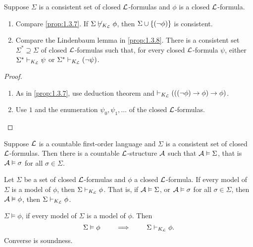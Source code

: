 \begin{proposition}
\label{prop:2.5.2}
Suppose $ \Sigma $ is a consistent set of closed $ \LL $-formulas and $ \phi $ is a closed $ \LL $-formula.
\begin{enumerate}
\item Compare \ref{prop:1.3.7}. If $ \Sigma \not\vdash_{K_{\LL}} \phi $, then $ \Sigma \cup \cb{\notb{\phi}} $ is consistent.
\item Compare the Lindenbaum lemma in \ref{prop:1.3.8}. There is a consistent set $ \Sigma^* \supseteq \Sigma $ of closed $ \LL $-formulas such that, for every closed $ \LL $-formula $ \psi $, either $ \Sigma^* \vdash_{K_{\LL}} \psi $ or $ \Sigma^* \vdash_{K_{\LL}} \notb{\psi} $.
\end{enumerate}
\end{proposition}

\begin{proof}
\hfill
\begin{enumerate}
\item As in \ref{prop:1.3.7}, use deduction theorem and $ \vdash_{K_{\LL}} \impb{\impb{\notb{\phi}}{\phi}}{\phi} $.
\item Use $ 1 $ and the enumeration $ \psi_0, \psi_1, \dots $ of the closed $ \LL $-formulas.
\end{enumerate}
\end{proof}

\pagebreak

\begin{theorem}
\label{thm:2.5.3}
Suppose $ \LL $ is a countable first-order language and $ \Sigma $ is a consistent set of closed $ \LL $-formulas. Then there is a countable $ \LL $-structure $ \AA $ such that $ \AA \vDash \Sigma $, that is $ \AA \vDash \sigma $ for all $ \sigma \in \Sigma $.
\end{theorem}

\begin{theorem}
\label{thm:2.5.4}
Let $ \Sigma $ be a set of closed $ \LL $-formulas and $ \phi $ a closed $ \LL $-formula. If every model of $ \Sigma $ is a model of $ \phi $, then $ \Sigma \vdash_{K_{\LL}} \phi $. That is, if $ \AA \vDash \Sigma $, or $ \AA \vDash \sigma $ for all $ \sigma \in \Sigma $, then $ \AA \vDash \phi $, then $ \Sigma \vdash_{K_{\LL}} \phi $.
\end{theorem}

\begin{notation2}
$ \Sigma \vDash \phi $, if every model of $ \Sigma $ is a model of $ \phi $. Then
$$ \Sigma \vDash \phi \qquad \implies \qquad \Sigma \vdash_{K_{\LL}} \phi. $$ Converse is soundness.
\end{notation2}

